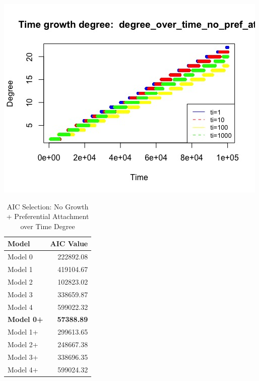\documentclass[12pt, a4paper]{article}
\begin{document}
  \begin{minipage}[t]{\linewidth}
      \includegraphics[width=\textwidth]{time_growth_degree_no_pref}
      \captionsetup{type=figure}
      \label{fig:time_growth_degree_no_pref}
    \end{minipage}
  
  \begin{table}[H]
      \centering
      \begin{tabular}{l r}
          Model & AIC Value\\
          \hline
          Model 0 & 222892.08\\
          Model 1 & 419104.67\\
          Model 2 &  102823.02\\
          Model 3 &  338659.87\\
          Model 4 &  599022.32\\
          \textbf{Model 0+} & \textbf{57388.89}\\
          Model 1+  &  299613.65\\
          Model 2+  &  248667.38\\
          Model 3+  &  338696.35\\
          Model 4+  &  599024.32\\
      \end{tabular}
      \caption{AIC Selection: No Growth + Preferential Attachment over Time Degree}
      \label{table:time_no_grow_pref_att_1}
  \end{table}
  
\end{document}
